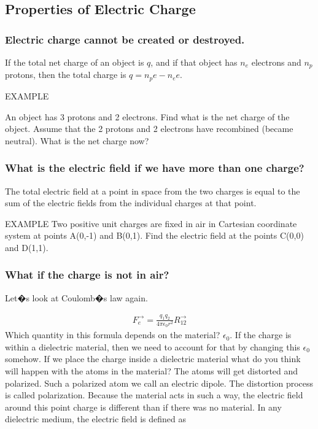 \subsection{Properties of Electric Charge}

\subsubsection{Electric charge cannot be created or destroyed.} If the total net charge of an object is $q$, and if that object has $n_e$ electrons and $n_p$ protons, then the total charge is $q=n_p e-n_e e$. 

{\large EXAMPLE}

An object has 3 protons and 2 electrons. Find what is the net charge of the object. Assume that the 2 protons and 2 electrons have recombined (became neutral). What is the net charge now?

\subsubsection{What is the electric field if we have more than one charge?}

The total electric field at a point in space from the two charges is equal to the sum of the electric fields from the individual charges at that point.

{\large EXAMPLE} Two positive unit charges are fixed in air in Cartesian coordinate system at points A(0,-1) and B(0,1). Find the electric field at the points C(0,0) and D(1,1).

\subsubsection{What if the charge is not in air?} 

Let�s look at Coulomb�s law again. 


\begin{eqnarray}
F^{\to}_e=\frac{q_1 q_2}{4 \pi \epsilon_0 r^2} R^{\to}_{12}
\end{eqnarray}\label{Coulombslaw2}
Which quantity in this formula depends on the material? $\epsilon_0$. If the charge is within a dielectric material, then we need to account for that by changing this $\epsilon_0$ somehow. If we place the charge inside a dielectric material what do you think will happen with the atoms in the material? The atoms will get distorted and polarized. Such a polarized atom we call an electric dipole. The distortion process is called polarization. Because the material acts in such a way, the electric field around this point charge is different than if there was no material. In any dielectric medium, the electric field is defined as


